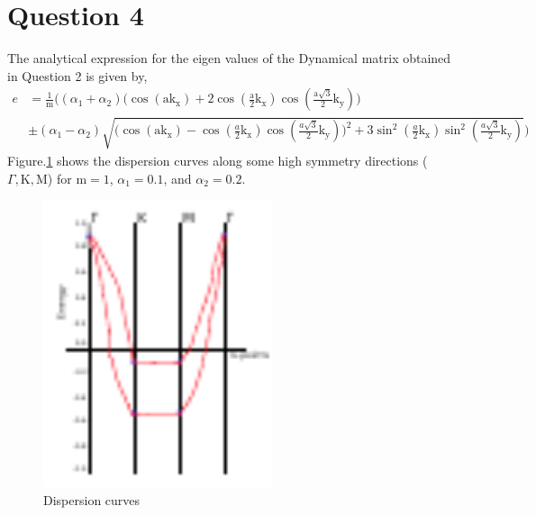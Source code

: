 \documentclass[a4paper]{article}
\begin{document}
\section*{Question 4}
The analytical expression for the eigen values of the Dynamical matrix obtained in Question 2 is given by,
\begin{equation}
    \begin{aligned}
    e & = \frac{1}{\mathrm{m}}\Bigg((\alpha_1 + \alpha_2)\Big(\cos(\mathrm{a}\mathrm{k}_\mathrm{x})+2\cos(\frac{\mathrm{a}}{2}\mathrm{k}_\mathrm{x})\cos(\frac{\mathrm{a}\sqrt{3} }{2}\mathrm{k}_\mathrm{y})\Big) \\
    & \pm (\alpha_1 - \alpha_2)\sqrt{\Big(\cos(\mathrm{a}\mathrm{k}_\mathrm{x}) - \cos(\frac{a}{2}\mathrm{k}_\mathrm{x})\cos(\frac{a\sqrt{3}}{2}\mathrm{k}_\mathrm{y})\Big)^2 + 3\sin^2(\frac{a}{2}\mathrm{k}_\mathrm{x})\sin^2(\frac{a\sqrt{3} }{2}\mathrm{k}_\mathrm{y})} \Bigg)
    \end{aligned}
\end{equation}
Figure.\ref{fig:2} shows the dispersion curves along some high symmetry directions ($\Gamma, \mathrm{K}, \mathrm{M}$) for $\mathrm{m}=1$, $\alpha_1=0.1$, and  $\alpha_2=0.2$.
\begin{figure}[htpb]
    \centering
    \includegraphics[width=0.6\textwidth]{plot.pdf}
    \caption{Dispersion curves}
    \label{fig:2}
\end{figure}
\end{document}
